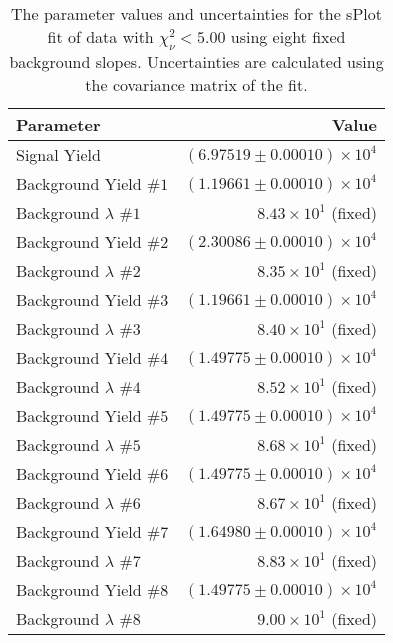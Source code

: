 
\begin{table}[ht]
    \begin{center}
        \begin{tabular}{lr}\toprule
            Parameter & Value \\\midrule
            Signal Yield & $(6.97519 \pm 0.00010) \times 10^{4}$ \\
            Background Yield $\#1$ & $(1.19661 \pm 0.00010) \times 10^{4}$ \\
            Background $\lambda$ $\#1$ & $8.43 \times 10^{1}$ (fixed) \\
            Background Yield $\#2$ & $(2.30086 \pm 0.00010) \times 10^{4}$ \\
            Background $\lambda$ $\#2$ & $8.35 \times 10^{1}$ (fixed) \\
            Background Yield $\#3$ & $(1.19661 \pm 0.00010) \times 10^{4}$ \\
            Background $\lambda$ $\#3$ & $8.40 \times 10^{1}$ (fixed) \\
            Background Yield $\#4$ & $(1.49775 \pm 0.00010) \times 10^{4}$ \\
            Background $\lambda$ $\#4$ & $8.52 \times 10^{1}$ (fixed) \\
            Background Yield $\#5$ & $(1.49775 \pm 0.00010) \times 10^{4}$ \\
            Background $\lambda$ $\#5$ & $8.68 \times 10^{1}$ (fixed) \\
            Background Yield $\#6$ & $(1.49775 \pm 0.00010) \times 10^{4}$ \\
            Background $\lambda$ $\#6$ & $8.67 \times 10^{1}$ (fixed) \\
            Background Yield $\#7$ & $(1.64980 \pm 0.00010) \times 10^{4}$ \\
            Background $\lambda$ $\#7$ & $8.83 \times 10^{1}$ (fixed) \\
            Background Yield $\#8$ & $(1.49775 \pm 0.00010) \times 10^{4}$ \\
            Background $\lambda$ $\#8$ & $9.00 \times 10^{1}$ (fixed) \\\bottomrule
        \end{tabular}
        \caption{The parameter values and uncertainties for the sPlot fit of data with $\chi^2_\nu < 5.00$ using eight fixed background slopes. Uncertainties are calculated using the covariance matrix of the fit.}\label{tab:splot-fit-results-chisqdof-5.00-fixed-8}
    \end{center}
\end{table}
